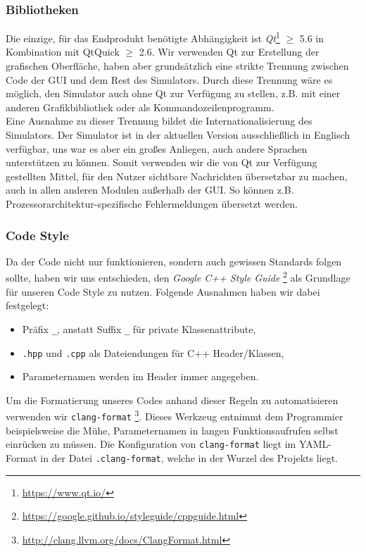 \subsubsection{Bibliotheken}

Die einzige, für das Endprodukt benötigte Abhängigkeit ist
\emph{Qt}\footnote{\url{https://www.qt.io/}} $\geq$ 5.6 in Kombination mit
QtQuick $\geq$ 2.6. Wir verwenden Qt zur Erstellung der grafischen Oberfläche,
haben aber grundsätzlich eine strikte Trennung zwischen Code der GUI und dem
Rest des Simulators. Durch diese Trennung wäre es möglich, den Simulator auch
ohne Qt zur Verfügung zu stellen, z.B. mit einer anderen Grafikbibliothek oder
als Kommandozeilenprogramm. \\ Eine Ausnahme zu dieser Trennung bildet die
Internationalisierung des Simulators. Der Simulator ist in der aktuellen Version
ausschließlich in Englisch verfügbar, uns war es aber ein großes Anliegen, auch
andere Sprachen unterstützen zu können. Somit verwenden wir die von Qt zur
Verfügung gestellten Mittel, für den Nutzer sichtbare Nachrichten übersetzbar zu machen,
auch in allen anderen Modulen außerhalb der GUI. So können z.B.
Prozessorarchitektur-spezifische Fehlermeldungen übersetzt werden.

\subsubsection{Code Style}

Da der Code nicht nur funktionieren, sondern auch gewissen Standards folgen
sollte, haben wir uns entschieden, den \emph{Google C++ Style Guide}
\footnote{\url{https://google.github.io/styleguide/cppguide.html}} als Grundlage
für unseren Code Style zu nutzen. Folgende Ausnahmen haben wir dabei festgelegt:

\begin{itemize}
  \item Präfix \texttt{\_}, anstatt Suffix \texttt{\_} für private Klassenattribute,
  \item \texttt{.hpp} und \texttt{.cpp} als Dateiendungen für C++
  Header/Klassen,
  \item Parameternamen werden im Header immer angegeben.
\end{itemize}

Um die Formatierung unseres Codes anhand dieser Regeln zu automatisieren
verwenden wir \texttt{clang-format}
\footnote{\url{http://clang.llvm.org/docs/ClangFormat.html}}. Dieses Werkzeug
entnimmt dem Programmier beispielsweise die Mühe, Parameternamen in langen
Funktionsaufrufen selbst einrücken zu müssen. Die Konfiguration von
\texttt{clang-format} liegt im YAML-Format in der Datei \texttt{.clang-format},
welche in der Wurzel des Projekts liegt.

